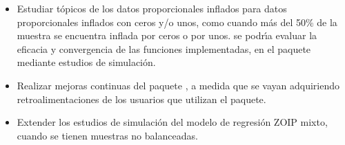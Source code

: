 \begin{itemize}
	\item Estudiar t\'{o}picos de los datos proporcionales inflados para datos proporcionales inflados con ceros y/o unos, como cuando m\'{a}s del 50\% de la muestra se encuentra inflada por ceros o por unos. se podr\'{\i}a evaluar la eficacia y convergencia de las funciones implementadas, en el paquete  mediante estudios de simulaci\'{o}n.
	\item Realizar mejoras continuas del paquete , a medida que se vayan adquiriendo retroalimentaciones de los usuarios que utilizan el paquete.
	\item Extender los estudios de simulaci\'{o}n del modelo de regresi\'{o}n ZOIP mixto, cuando se tienen muestras no balanceadas.

\end{itemize}

\nocite{Seoane1}
\nocite{Lindstrom1}
\nocite{Evans1}
\nocite{kieschnick1}
\nocite{Cook1}
\nocite{Houston1}
\nocite{Venezuela1}
\nocite{Git1}
